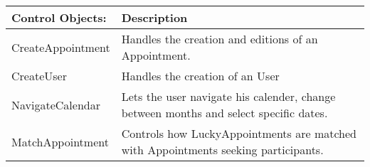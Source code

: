 {\tabulinesep=1.2mm
\begin{tabu}{ | p{6cm} | p{10cm} |}
    \hline
\textbf{Control Objects:} 	& 		\textbf{Description} \\ \hline
    CreateAppointment       &       Handles the creation and editions of an Appointment.\\\hline
    CreateUser              &       Handles the creation of an User\\\hline
    NavigateCalendar        &       Lets the user navigate his calender, change between months and select specific dates.\\\hline
    MatchAppointment 	    & 		Controls how LuckyAppointments are matched with Appointments seeking participants.\\ \hline
\end{tabu}
}